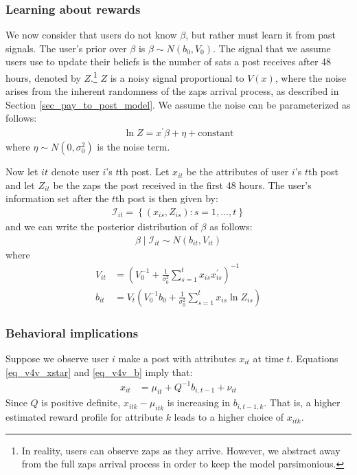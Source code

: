 \subsubsection*{Learning about rewards}

We now consider that users do not know $\beta$, but rather must learn it from past signals. The user's prior over $\beta$ is $\beta \sim N(b_0, V_0)$. The signal that we assume users use to update their beliefs is the number of sats a post receives after 48 hours, denoted by $Z$.\footnote{In reality, users can observe zaps as they arrive. However, we abstract away from the full zaps arrival process in order to keep the model parsimonious.} $Z$ is a noisy signal proportional to $V(x)$, where the noise arises from the inherent randomness of the zaps arrival process, as described in Section \ref{sec_pay_to_post_model}.  We assume the noise can be parameterized as follows:
\begin{align}
\ln Z = x^\prime \beta + \eta + \text{constant}
\end{align}
where $\eta \sim N(0,\sigma_0^2)$ is the noise term.

Now let $it$ denote user $i$'s $t$th post. Let $x_{it}$ be the attributes of user $i$'s $t$th post and let $Z_{it}$ be the zaps the post received in the first 48 hours. The user's information set after the $t$th post is then given by:
\begin{align}
\mathcal{I}_{it} = \left\{ (x_{is}, Z_{is}) : s=1,\ldots,t  \right\}
\end{align}
and we can write the posterior distribution of $\beta$ as follows:
\begin{align}
\beta \mid \mathcal{I}_{it} \sim N(b_{it}, V_{it})
\end{align}
where
\begin{align}
V_{it} &= \left( V_0^{-1} + \frac{1}{\sigma_0^2} \sum_{s=1}^{t} x_{is} x_{is}^\prime \right)^{-1} \label{eq_v4v_V} \\
b_{it} &= V_t \left( V_0^{-1} b_0 + \frac{1}{\sigma_0^2} \sum_{s=1}^t x_{is} \ln Z_{is} \right) \label{eq_v4v_b}
\end{align}


\subsubsection*{Behavioral implications}

Suppose we observe user $i$ make a post with attributes $x_{it}$ at time $t$. Equations \eqref{eq_v4v_xstar} and \eqref{eq_v4v_b} imply that:
\begin{align}
x_{it} &= \mu_{it} + Q^{-1} b_{i,t-1} + \nu_{it} \label{eq_v4v_xit}
\end{align}
Since $Q$ is positive definite, $x_{itk} - \mu_{itk}$ is increasing in $b_{i,t-1,k}$. That is, a higher estimated reward profile for attribute $k$ leads to a higher choice of $x_{itk}$. 

